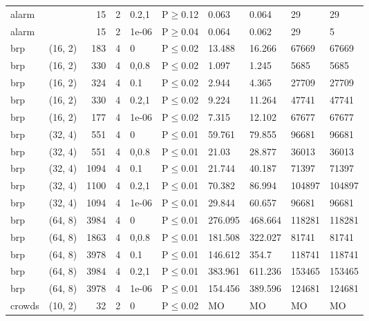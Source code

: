 \begin{longtable}{llrrllllll}
 alarm         &          &     	15 &   2 & 0.2,1 & P$\geq$0.12  & 0.063   & 0.064    & 29     & 29     \\
 alarm         &          &     	15 &   2 & 1e-06 & P$\geq$0.04  & 0.064   & 0.062    & 29     & 5      \\
 brp           & (16, 2)  &    	183 &   4 & 0     & P$\leq$0.02  & 13.488  & 16.266   & 67669  & 67669  \\
 brp           & (16, 2)  &    	330 &   4 & 0,0.8 & P$\leq$0.02  & 1.097   & 1.245    & 5685   & 5685   \\
 brp           & (16, 2)  &    	324 &   4 & 0.1   & P$\leq$0.02  & 2.944   & 4.365    & 27709  & 27709  \\
 brp           & (16, 2)  &    	330 &   4 & 0.2,1 & P$\leq$0.02  & 9.224   & 11.264   & 47741  & 47741  \\
 brp           & (16, 2)  &    	177 &   4 & 1e-06 & P$\leq$0.02  & 7.315   & 12.102   & 67677  & 67677  \\
 brp           & (32, 4)  &    	551 &   4 & 0     & P$\leq$0.01  & 59.761  & 79.855   & 96681  & 96681  \\
 brp           & (32, 4)  &    	551 &   4 & 0,0.8 & P$\leq$0.01  & 21.03   & 28.877   & 36013  & 36013  \\
 brp           & (32, 4)  &   	1094 &   4 & 0.1   & P$\leq$0.01  & 21.744  & 40.187   & 71397  & 71397  \\
 brp           & (32, 4)  &   	1100 &   4 & 0.2,1 & P$\leq$0.01  & 70.382  & 86.994   & 104897 & 104897 \\
 brp           & (32, 4)  &   	1094 &   4 & 1e-06 & P$\leq$0.01  & 29.844  & 60.657   & 96681  & 96681  \\
 brp           & (64, 8)  &   	3984 &   4 & 0     & P$\leq$0.01  & 276.095 & 468.664  & 118281 & 118281 \\
 brp           & (64, 8)  &   	1863 &   4 & 0,0.8 & P$\leq$0.01  & 181.508 & 322.027  & 81741  & 81741  \\
 brp           & (64, 8)  &   	3978 &   4 & 0.1   & P$\leq$0.01  & 146.612 & 354.7    & 118741 & 118741 \\
 brp           & (64, 8)  &   	3984 &   4 & 0.2,1 & P$\leq$0.01  & 383.961 & 611.236  & 153465 & 153465 \\
 brp           & (64, 8)  &   	3978 &   4 & 1e-06 & P$\leq$0.01  & 154.456 & 389.596  & 124681 & 124681 \\
 crowds        & (10, 2)  &     	32 &   2 & 0     & P$\leq$0.02  & MO      & MO       & MO     & MO     \\

\end{longtable}
